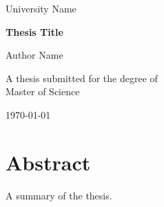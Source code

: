 \documentclass[12pt,oneside]{book}
\begin{document}
\frontmatter
\begin{titlepage}
  \centering
  {\Large University Name\par}
  \vspace{3cm}
  {\Huge\bfseries Thesis Title\par}
  \vspace{2cm}
  {\Large Author Name\par}
  \vfill
  {\large A thesis submitted for the degree of\\ Master of Science\par}
  \vspace{1cm}
  {\large \today\par}
\end{titlepage}

\chapter*{Abstract}
A summary of the thesis.

\tableofcontents
\listoffigures
\listoftables

\mainmatter




\backmatter


\end{document}
